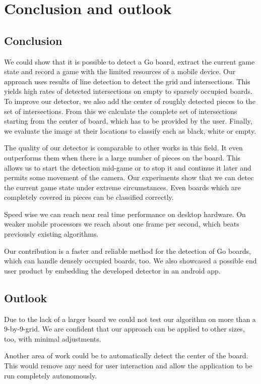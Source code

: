 
\chapter{Conclusion and outlook}
\section{Conclusion}
We could show that it is possible to detect a Go board, extract the current game state and record a game with the limited resources of a mobile device. Our approach uses results of line detection to detect the grid and intersections. This yields high rates of detected intersections on empty to sparsely occupied boards. To improve our detector, we also add the center of roughly detected pieces to the set of intersections. From this we calculate the complete set of intersections starting from the center of board, which has to be provided by the user. Finally, we evaluate the image at their locations to classify each as black, white or empty.

The quality of our detector is comparable to other works in this field. It even outperforms them when there is a large number of pieces on the board. This allows us to start the detection mid-game or to stop it and continue it later and permits some movement of the camera. Our experiments show that we can detec the current game state under extreme circumstances. Even boards which are completely covered in pieces can be classified correctly.

Speed wise we can reach near real time performance on desktop hardware. On weaker mobile processors we reach about one frame per second, which beats previously existing algorithms.

Our contribution is a faster and reliable method for the detection of Go boards, which can handle densely occupied boards, too. We also showcased a possible end user product by embedding the developed detector in an android app.

\section{Outlook}
Due to the lack of a larger board we could not test our algorithm on more than a 9-by-9-grid. We are confident that our approach can be applied to other sizes, too, with minimal adjustments.

Another area of work could be to automatically detect the center of the board. This would remove any need for user interaction and allow the application to be run completely autonomously.

